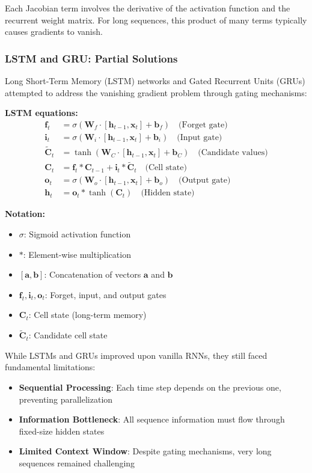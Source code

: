 Each Jacobian term involves the derivative of the activation function and the recurrent weight matrix. For long sequences, this product of many terms typically causes gradients to vanish.

\subsubsection{LSTM and GRU: Partial Solutions}

Long Short-Term Memory (LSTM) networks and Gated Recurrent Units (GRUs) attempted to address the vanishing gradient problem through gating mechanisms:

\textbf{LSTM equations:}
\begin{align}
\mathbf{f}_t &= \sigma(\mathbf{W}_f \cdot [\mathbf{h}_{t-1}, \mathbf{x}_t] + \mathbf{b}_f) \quad \text{(Forget gate)} \\
\mathbf{i}_t &= \sigma(\mathbf{W}_i \cdot [\mathbf{h}_{t-1}, \mathbf{x}_t] + \mathbf{b}_i) \quad \text{(Input gate)} \\
\tilde{\mathbf{C}}_t &= \tanh(\mathbf{W}_C \cdot [\mathbf{h}_{t-1}, \mathbf{x}_t] + \mathbf{b}_C) \quad \text{(Candidate values)} \\
\mathbf{C}_t &= \mathbf{f}_t * \mathbf{C}_{t-1} + \mathbf{i}_t * \tilde{\mathbf{C}}_t \quad \text{(Cell state)} \\
\mathbf{o}_t &= \sigma(\mathbf{W}_o \cdot [\mathbf{h}_{t-1}, \mathbf{x}_t] + \mathbf{b}_o) \quad \text{(Output gate)} \\
\mathbf{h}_t &= \mathbf{o}_t * \tanh(\mathbf{C}_t) \quad \text{(Hidden state)}
\end{align}
\begin{notationbox}
\textbf{Notation:}
\begin{itemize}
    \item $\sigma$: Sigmoid activation function
    \item $*$: Element-wise multiplication
    \item $[\mathbf{a}, \mathbf{b}]$: Concatenation of vectors $\mathbf{a}$ and $\mathbf{b}$
    \item $\mathbf{f}_t, \mathbf{i}_t, \mathbf{o}_t$: Forget, input, and output gates
    \item $\mathbf{C}_t$: Cell state (long-term memory)
    \item $\tilde{\mathbf{C}}_t$: Candidate cell state
\end{itemize}
\end{notationbox}

While LSTMs and GRUs improved upon vanilla RNNs, they still faced fundamental limitations:
\begin{itemize}
    \item \textbf{Sequential Processing}: Each time step depends on the previous one, preventing parallelization
    \item \textbf{Information Bottleneck}: All sequence information must flow through fixed-size hidden states
    \item \textbf{Limited Context Window}: Despite gating mechanisms, very long sequences remained challenging
\end{itemize}

